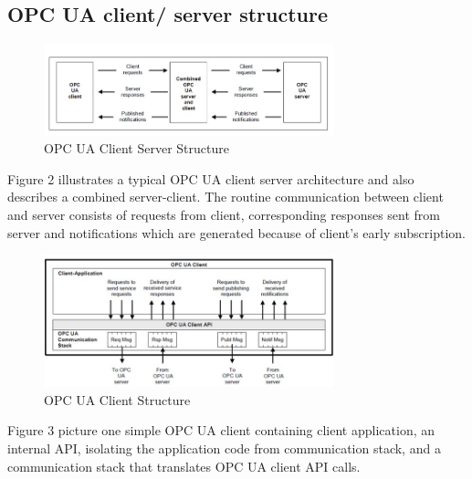 \documentclass[]{llncs}
\begin{document}
\subsection{OPC UA client/ server structure}
\begin{figure}
	\centering
	\includegraphics[width=0.75\textwidth]{cs.jpg}
		\caption[ ]{OPC UA Client Server Structure}
	\label{fig:cs}
\end{figure}
Figure 2 illustrates a typical OPC UA client server architecture and also describes a combined server-client. The routine communication between client and server consists of requests from client, corresponding responses sent from server and notifications which are generated because of client’s early subscription.

\begin{figure}
	\centering
	\includegraphics[width=0.75\textwidth]{client.jpg}
		\caption[ ]{OPC UA Client Structure}
	\label{fig:client}
\end{figure}

Figure 3 picture one simple OPC UA client containing client application, an internal API, isolating the application code from communication stack, and a communication stack that translates OPC UA client API calls.
\end{document}
